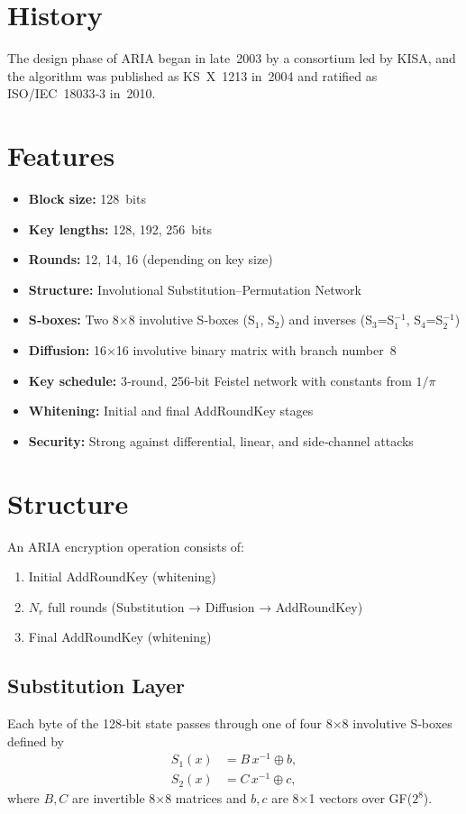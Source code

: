 \documentclass[11pt,a4paper]{report}
\begin{document}
\section{History}
The design phase of ARIA began in late 2003 by a consortium led by KISA, and the algorithm was published as KS X 1213 in 2004 and ratified as ISO/IEC 18033‑3 in 2010.

\section{Features}
\begin{itemize}
	\item \textbf{Block size:} 128 bits
	\item \textbf{Key lengths:} 128, 192, 256 bits
	\item \textbf{Rounds:} 12, 14, 16 (depending on key size)
	\item \textbf{Structure:} Involutional Substitution–Permutation Network
	\item \textbf{S‑boxes:} Two 8×8 involutive S‑boxes (S\(_1\), S\(_2\)) and inverses (S\(_3\)=S\(_1^{-1}\), S\(_4\)=S\(_2^{-1}\))
	\item \textbf{Diffusion:} 16×16 involutive binary matrix with branch number 8
	\item \textbf{Key schedule:} 3‑round, 256‑bit Feistel network with constants from $1/\pi$
	\item \textbf{Whitening:} Initial and final AddRoundKey stages
	\item \textbf{Security:} Strong against differential, linear, and side‑channel attacks
\end{itemize}

\section{Structure}
An ARIA encryption operation consists of:
\begin{enumerate}
	\item Initial AddRoundKey (whitening)
	\item \(N_r\) full rounds (Substitution → Diffusion → AddRoundKey)
	\item Final AddRoundKey (whitening)
\end{enumerate}

\subsection{Substitution Layer}
Each byte of the 128‑bit state passes through one of four 8×8 involutive S‑boxes defined by
\[
\begin{aligned}
	S_1(x) &= B\,x^{-1} \oplus b,\\
	S_2(x) &= C\,x^{-1} \oplus c,
\end{aligned}
\]
where \(B,C\) are invertible 8×8 matrices and \(b,c\) are 8×1 vectors over GF(\(2^8\)).
\end{document}

